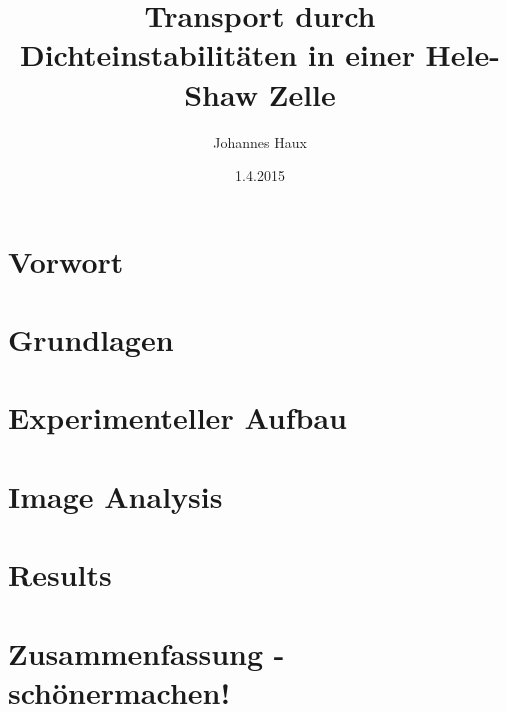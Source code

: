 \documentclass[oneside, a4paper, DIV=11,twocolumn]{book}
\title{Transport durch Dichteinstabilitäten in einer Hele-Shaw Zelle}
\author{Johannes Haux}
\date{1.4.2015}
\begin{document}
\maketitle

\chapter{Vorwort}


\chapter{Grundlagen}


\chapter{Experimenteller Aufbau}


\chapter{Image Analysis}


\chapter{Results}


\chapter{Zusammenfassung - schönermachen!}




\end{document}
